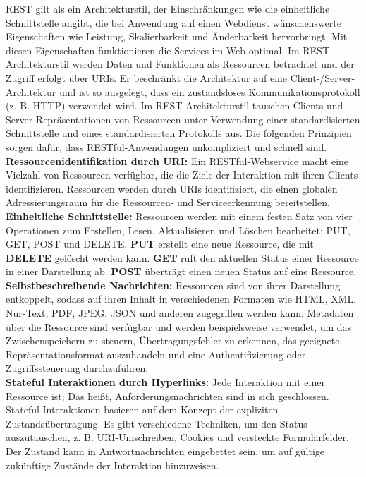 REST gilt als ein Architekturstil, der Einschränkungen wie die einheitliche Schnittstelle angibt, die bei Anwendung auf einen Webdienst wünschenswerte Eigenschaften wie Leistung, Skalierbarkeit und Änderbarkeit hervorbringt. Mit diesen Eigenschaften funktionieren die Services im Web optimal. Im REST-Architekturstil werden Daten und Funktionen als Ressourcen betrachtet und der Zugriff erfolgt über URIs. Er beschränkt die Architektur auf eine Client-/Server-Architektur und ist so ausgelegt, dass ein zustandsloses Kommunikationsprotokoll (z. B. HTTP) verwendet wird. Im REST-Architekturstil tauschen Clients und Server Repräsentationen von Ressourcen unter Verwendung einer standardisierten Schnittstelle und eines standardisierten Protokolls aus. Die folgenden Prinzipien sorgen dafür, dass RESTful-Anwendungen unkompliziert und schnell sind\cite{rws13od}.\\

\textbf{Ressourcenidentifikation durch URI:} Ein RESTful-Webservice macht eine Vielzahl von Ressourcen verfügbar, die die Ziele der Interaktion mit ihren Clients identifizieren. Ressourcen werden durch URIs identifiziert, die einen globalen Adressierungsraum für die Ressourcen- und Serviceerkennung bereitstellen\cite{rws13od}.\\

\textbf{Einheitliche Schnittstelle:} Ressourcen werden mit einem festen Satz von vier Operationen zum Erstellen, Lesen, Aktualisieren und Löschen bearbeitet: PUT, GET, POST und DELETE. \textbf{PUT} erstellt eine neue Ressource, die mit \textbf{DELETE} gelöscht werden kann. \textbf{GET} ruft den aktuellen Status einer Ressource in einer Darstellung ab. \textbf{POST} überträgt einen neuen Status auf eine Ressource\cite{rws13od}.\\

\textbf{Selbstbeschreibende Nachrichten:} Ressourcen sind von ihrer Darstellung entkoppelt, sodass auf ihren Inhalt in verschiedenen Formaten wie HTML, XML, Nur-Text, PDF, JPEG, JSON und anderen zugegriffen werden kann. Metadaten über die Ressource sind verfügbar und werden beispielsweise verwendet, um das Zwischenspeichern zu steuern, Übertragungsfehler zu erkennen, das geeignete Repräsentationsformat auszuhandeln und eine Authentifizierung oder Zugriffssteuerung durchzuführen\cite{rws13od}.\\

\textbf{Stateful Interaktionen durch Hyperlinks:} Jede Interaktion mit einer Ressource ist; Das heißt, Anforderungsnachrichten sind in sich geschlossen. Stateful Interaktionen basieren auf dem Konzept der expliziten Zustandsübertragung. Es gibt verschiedene Techniken, um den Status auszutauschen, z. B. URI-Umschreiben, Cookies und versteckte Formularfelder. Der Zustand kann in Antwortnachrichten eingebettet sein, um auf gültige zukünftige Zustände der Interaktion hinzuweisen\cite{rws13od}.

